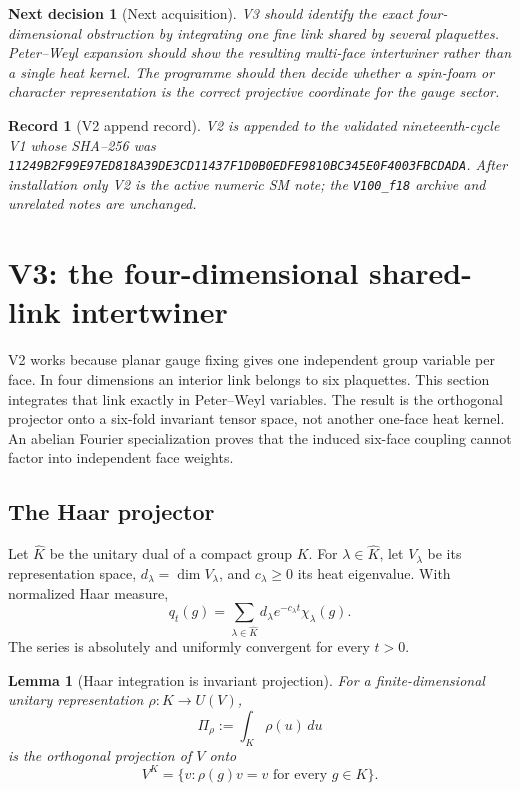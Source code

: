 \documentclass[11pt]{article}
\newtheorem{lemma}[theorem]{Lemma}
\newtheorem{decision}[theorem]{Next decision}
\newtheorem{record}[theorem]{Record}
\theoremstyle{remark}
\begin{document}
\begin{decision}[Next acquisition]
\label{dec:v19v2-next}
V3 should identify the exact four-dimensional obstruction by integrating
one fine link shared by several plaquettes.  Peter--Weyl expansion should
show the resulting multi-face intertwiner rather than a single heat kernel.
The programme should then decide whether a spin-foam or character
representation is the correct projective coordinate for the gauge sector.
\end{decision}

\begin{record}[V2 append record]
\label{rec:v19v2}
V2 is appended to the validated nineteenth-cycle V1 whose SHA--256 was
\texttt{11249B2F99E97ED818A39DE3CD11437F1D0B0EDFE9810BC345E0F4003FBCDADA}.
After installation only V2 is the active numeric SM note; the
\texttt{V100\_f18} archive and unrelated notes are unchanged.
\end{record}


\section{V3: the four-dimensional shared-link intertwiner}
\label{sec:v19v3}

V2 works because planar gauge fixing gives one independent group variable
per face.  In four dimensions an interior link belongs to six plaquettes.
This section integrates that link exactly in Peter--Weyl variables.  The
result is the orthogonal projector onto a six-fold invariant tensor space,
not another one-face heat kernel.  An abelian Fourier specialization proves
that the induced six-face coupling cannot factor into independent face
weights.

\subsection{The Haar projector}

Let \(\widehat K\) be the unitary dual of a compact group \(K\).  For
\(\lambda\in\widehat K\), let \(V_\lambda\) be its representation space,
\(d_\lambda=\dim V_\lambda\), and \(c_\lambda\ge0\) its heat eigenvalue.
With normalized Haar measure,
\[
 q_t(g)=\sum_{\lambda\in\widehat K}
 d_\lambda e^{-c_\lambda t}\chi_\lambda(g).                \tag{6.1}
\]
The series is absolutely and uniformly convergent for every \(t>0\).

\begin{lemma}[Haar integration is invariant projection]
\label{lem:v19v3-haar-projector}
For a finite-dimensional unitary representation
\(\rho:K\to U(V)\),
\[
 \Pi_\rho:=\int_K\rho(u)\,du                               \tag{6.2}
\]
is the orthogonal projection of \(V\) onto
\[
 V^K=\{v:\rho(g)v=v\text{ for every }g\in K\}.             \tag{6.3}
\]
\end{lemma}
\end{document}
